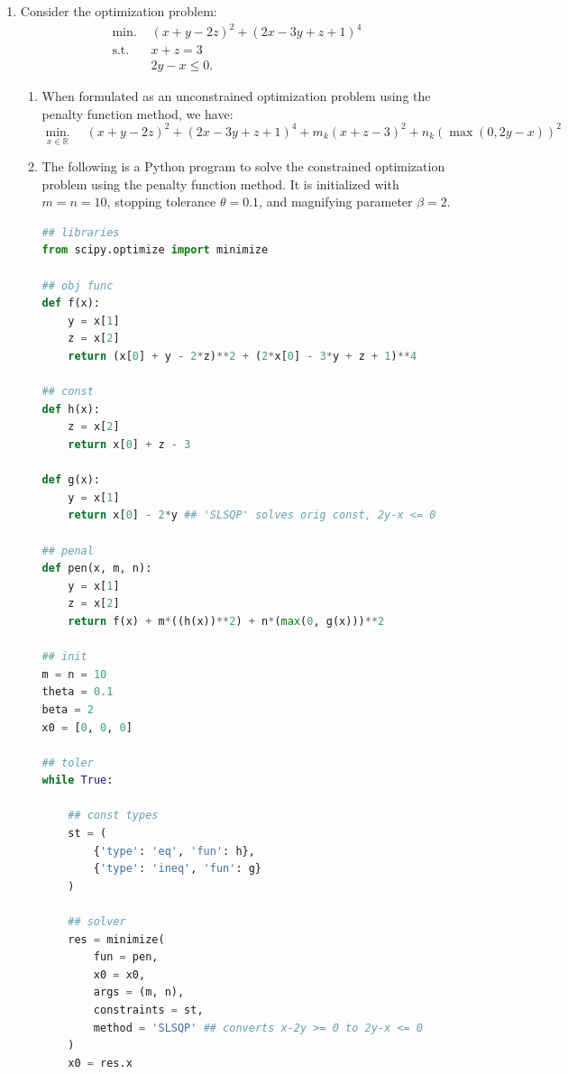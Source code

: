 \documentclass{article}
\begin{document}
\begin{enumerate}
    \item Consider the optimization problem:
        \begin{equation}
            \begin{split}
                \text{min. } & (x+y-2z)^2 +(2x-3y+z+1)^4 \\
                \text{s.t. }
                & x+z=3\\
                & 2y-x \leq 0.
            \end{split}
        \end{equation}

    \begin{enumerate}
        \item When formulated as an unconstrained optimization problem using the penalty function method, we have:
        \begin{equation}
            \operatorname*{min.}_{x\in\mathbb{R}} \quad (x+y-2z)^2 +(2x-3y+z+1)^4 + m_k (x+z-3)^2 + n_k(\max(0,2y-x))^2
        \end{equation}

        \item The following is a Python program to solve the constrained optimization problem using the penalty function method. It is initialized with $m = n = 10$, stopping tolerance $\theta = 0.1$, and magnifying parameter $\beta = 2$.\\

\begin{lstlisting}[language=Python, title=Fig. Python 3(b)]
## libraries
from scipy.optimize import minimize

## obj func
def f(x):
    y = x[1]
    z = x[2]
    return (x[0] + y - 2*z)**2 + (2*x[0] - 3*y + z + 1)**4

## const
def h(x):
    z = x[2]
    return x[0] + z - 3

def g(x):
    y = x[1]
    return x[0] - 2*y ## 'SLSQP' solves orig const, 2y-x <= 0

## penal
def pen(x, m, n):
    y = x[1]
    z = x[2]
    return f(x) + m*((h(x))**2) + n*(max(0, g(x)))**2

## init
m = n = 10
theta = 0.1
beta = 2
x0 = [0, 0, 0]

## toler
while True:

    ## const types
    st = (
        {'type': 'eq', 'fun': h},
        {'type': 'ineq', 'fun': g}
    )

    ## solver
    res = minimize(
        fun = pen, 
        x0 = x0,
        args = (m, n),
        constraints = st,
        method = 'SLSQP' ## converts x-2y >= 0 to 2y-x <= 0
    )
    x0 = res.x


\end{lstlisting}
\end{enumerate}
\end{enumerate}
\end{document}
